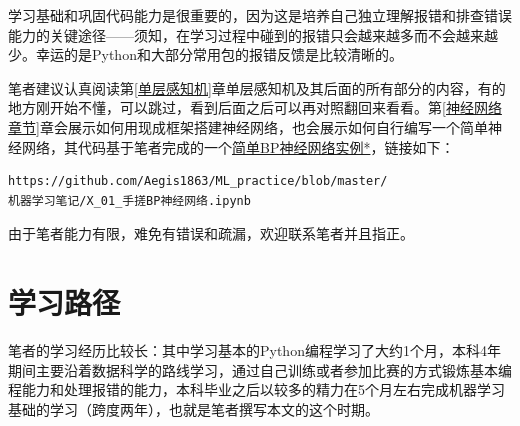 \documentclass[a5paper, 11pt]{ctexbook}
\begin{document}
学习基础和巩固代码能力是很重要的，因为这是培养自己独立理解报错和排查错误能力的关键途径——须知，在学习过程中碰到的报错只会越来越多而不会越来越少。幸运的是Python和大部分常用包的报错反馈是比较清晰的。

笔者建议认真阅读第\ref{单层感知机}章单层感知机及其后面的所有部分的内容，有的地方刚开始不懂，可以跳过，看到后面之后可以再对照翻回来看看。第\ref{神经网络章节}章会展示如何用现成框架搭建神经网络，也会展示如何自行编写一个简单神经网络，其代码基于笔者完成的一个\href{https://github.com/Aegis1863/ML_practice/blob/master/机器学习笔记/X_01_手搓BP神经网络.ipynb}{简单BP神经网络实例*}，链接如下：
\begin{verbatim}
https://github.com/Aegis1863/ML_practice/blob/master/
机器学习笔记/X_01_手搓BP神经网络.ipynb
\end{verbatim}\label{代码链接}


由于笔者能力有限，难免有错误和疏漏，欢迎联系笔者并且指正。

\section*{学习路径}

\begin{sloppypar} %
笔者的学习经历比较长：其中学习基本的Python编程学习了大约1个月，本科4年期间主要沿着数据科学的路线学习，通过自己训练或者参加比赛的方式锻炼基本编程能力和处理报错的能力，本科毕业之后以较多的精力在5个月左右完成机器学习基础的学习（跨度两年），也就是笔者撰写本文的这个时期。
\end{sloppypar}
\end{document}
